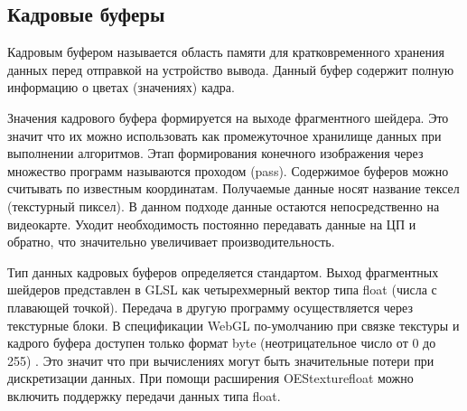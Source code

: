 \subsection{Кадровые буферы}

Кадровым буфером называется область памяти для кратковременного хранения данных перед отправкой
на устройство вывода. Данный буфер содержит полную информацию о цветах (значениях) кадра.

Значения кадрового буфера формируется на выходе фрагментного шейдера. Это значит что их можно 
использовать как промежуточное хранилище данных при выполнении алгоритмов. Этап формирования 
конечного изображения через множество программ называются проходом (pass). Содержимое буферов 
можно считывать по известным координатам. Получаемые данные носят название тексел (текстурный 
пиксел). В данном подходе данные остаются непосредственно на видеокарте. Уходит необходимость
постоянно передавать данные на ЦП и обратно, что значительно увеличивает производительность.

Тип данных кадровых буферов определяется стандартом. Выход фрагментных шейдеров представлен в 
GLSL как четырехмерный вектор типа float (числа с плавающей точкой). Передача в другую программу
осуществляется через текстурные блоки. В спецификации WebGL по-умолчанию при связке текстуры
и кадрого буфера доступен только формат byte (неотрицательное число от 0 до 255) \cite{khr11}. 
Это значит что при вычислениях могут быть значительные потери при дискретизации данных. При помощи
расширения OES\textunderscore{}texture\textunderscore{}float можно включить поддержку передачи 
данных типа float.
